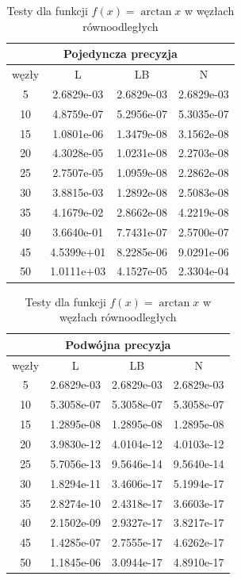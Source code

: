 \documentclass[a4paper]{article}
\begin{document}
\begin{table}[!h]
  \begin{minipage}{.55\linewidth}
    \begin{tabular}{c|ccc}
      \multicolumn{4}{c}{Pojedyncza precyzja}\\
      \hline \hline
      węzły & L & LB & N \\
      \hline
5 & 2.6829e-03 & 2.6829e-03 & 2.6829e-03\\
10 & 4.8759e-07 & 5.2956e-07 & 5.3035e-07\\
15 & 1.0801e-06 & 1.3479e-08 & 3.1562e-08\\
20 & 4.3028e-05 & 1.0231e-08 & 2.2703e-08\\
25 & 2.7507e-05 & 1.0959e-08 & 2.2862e-08\\
30 & 3.8815e-03 & 1.2892e-08 & 2.5083e-08\\
35 & 4.1679e-02 & 2.8662e-08 & 4.2219e-08\\
40 & 3.6640e-01 & 7.7431e-07 & 2.5700e-07\\
45 & 4.5399e+01 & 8.2285e-06 & 9.0291e-06\\
50 & 1.0111e+03 & 4.1527e-05 & 2.3304e-04\\
    \end{tabular}
  \end{minipage}%
  \begin{minipage}{.55\linewidth}
    \begin{tabular}{c|ccc}
      \multicolumn{4}{c}{Podwójna precyzja}\\
      \hline \hline
      węzły & L & LB & N \\
      \hline
5 & 2.6829e-03 & 2.6829e-03 & 2.6829e-03\\
10 & 5.3058e-07 & 5.3058e-07 & 5.3058e-07\\
15 & 1.2895e-08 & 1.2895e-08 & 1.2895e-08\\
20 & 3.9830e-12 & 4.0104e-12 & 4.0103e-12\\
25 & 5.7056e-13 & 9.5646e-14 & 9.5640e-14\\
30 & 1.8294e-11 & 3.4606e-17 & 5.1994e-17\\
35 & 2.8274e-10 & 2.4318e-17 & 3.6603e-17\\
40 & 2.1502e-09 & 2.9327e-17 & 3.8217e-17\\
45 & 1.4285e-07 & 2.7555e-17 & 4.6262e-17\\
50 & 1.1845e-06 & 3.0944e-17 & 4.8910e-17\\
    \end{tabular}
  \end{minipage}
  \caption{Testy dla funkcji $f(x) = \arctan{x}$ w węzłach równoodległych}
\end{table}
\end{document}
